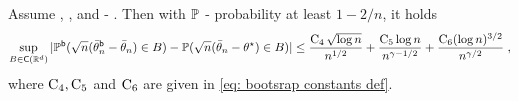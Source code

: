 \begin{theorem}
\label{th:bootstrap_validity}
Assume , , and  - . Then with $\mathbb{P}$ - probability at least $1 - 2/n$, it holds
\begin{equation}
\label{eq:gaussian_approximation_bootstrap}
\sup_{B \in \mathsf{C}(\mathbb{R}^{d})} |\mathbb{P}^{\mathsf{b}}(\sqrt n (\bar{\theta}_{n}^{\mathsf{b}} - \bar{\theta}_n) \in B ) - \mathbb{P}(\sqrt n (\bar{\theta}_n - \theta^\star) \in B)| \le   \frac{\operatorname{C}_4 \sqrt{\log n}}{n^{1/2}} + \frac{\operatorname{C}_5 \log n}{n^{\gamma - 1/2} } +  \frac{\operatorname{C}_6 (\log n)^{3/2}}{n^{\gamma/2}} \;,
\end{equation}
where $\operatorname{C}_4, \operatorname{C}_5$ and $\operatorname{C}_6$ are given in \eqref{eq: bootsrap constants def}. 
\end{theorem}

